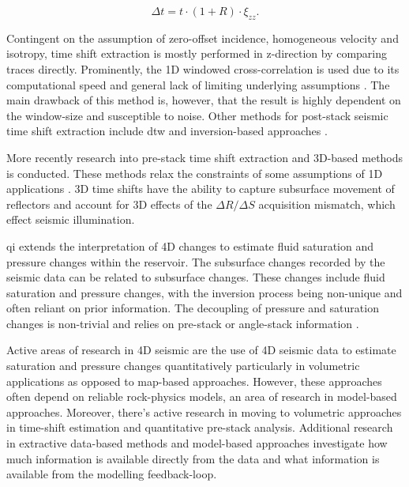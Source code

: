\begin{equation}
    \Delta t = t \cdot (1 + R) \cdot \xi_{zz}.
\end{equation}

Contingent on the assumption of zero-offset incidence, homogeneous velocity and isotropy, time shift extraction is mostly performed in z-direction by comparing traces directly. Prominently, the 1D windowed cross-correlation is used due to its computational speed and general lack of limiting underlying assumptions \citep{Rickett2001-nx}. The main drawback of this method is, however, that the result is highly dependent on the window-size and susceptible to noise. Other methods for post-stack seismic time shift extraction include \ac{dtw} \citep{Hale2013} and inversion-based approaches \citep{Rickett2007-yo}. 

More recently research into pre-stack time shift extraction and 3D-based methods is conducted. These methods relax the constraints of some assumptions of 1D applications \citep{ghaderi2005pre, hall2002time}. 3D time shifts have the ability to capture subsurface movement of reflectors and account for 3D effects of the $\Delta R / \Delta S$ acquisition mismatch, which effect seismic illumination.

\acf{qi} extends the interpretation of 4D changes to estimate fluid saturation and pressure changes within the reservoir. The subsurface changes recorded by the seismic data can be related to subsurface changes. These changes include fluid saturation and pressure changes, with the inversion process being non-unique and often reliant on prior information. The decoupling of pressure and saturation changes is non-trivial and relies on pre-stack or angle-stack information \citep{Landro2001-rz}.

Active areas of research in 4D seismic are the use of 4D seismic data to estimate saturation and pressure changes quantitatively particularly in volumetric applications as opposed to map-based approaches. However, these approaches often depend on reliable rock-physics models, an area of research in model-based approaches. Moreover, there's active research in moving to volumetric approaches in time-shift estimation and quantitative pre-stack analysis. Additional research in extractive data-based methods and model-based approaches investigate how much information is available directly from the data and what information is available from the modelling feedback-loop.